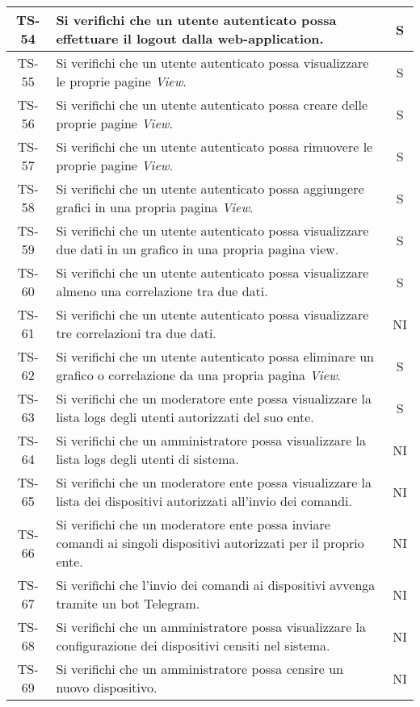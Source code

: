 \begin{center}
\begin{longtable}{|c|p{10cm}|c|}
			 \hline
			 TS-54 & Si verifichi che un utente autenticato possa effettuare il logout dalla web-application. & S \\
			 \hline
			 TS-55 & Si verifichi che un utente autenticato possa visualizzare le proprie pagine \textit{View}. & S \\
			 \hline
			 TS-56 & Si verifichi che un utente autenticato possa creare delle proprie pagine \textit{View}. & S \\
			 \hline
			 TS-57 & Si verifichi che un utente autenticato possa rimuovere le proprie pagine \textit{View}. & S \\
			 \hline
			 TS-58 & Si verifichi che un utente autenticato possa aggiungere grafici in una propria pagina  \textit{View}. & S \\
			 \hline
			 TS-59 & Si verifichi che un utente autenticato possa visualizzare due dati in un grafico in una propria pagina view. & S \\
			 \hline
			 TS-60 & Si verifichi che un utente autenticato possa visualizzare almeno una correlazione tra due dati. & S \\
			 \hline
			 TS-61 & Si verifichi che un utente autenticato possa visualizzare tre correlazioni tra due dati. & NI \\
			 \hline
			 TS-62 & Si verifichi che un utente autenticato possa eliminare un grafico o correlazione da una propria pagina \textit{View}. & S \\
			 \hline
			 TS-63 & Si verifichi che un moderatore ente possa visualizzare la lista logs degli utenti autorizzati del suo ente. & S \\
			 \hline
			 TS-64 & Si verifichi che un amministratore possa visualizzare la lista logs degli utenti di sistema. & NI \\
			 \hline
			 TS-65 & Si verifichi che un moderatore ente possa visualizzare la lista dei dispositivi autorizzati all'invio dei comandi. & NI \\
			 \hline
			 TS-66 & Si verifichi che un moderatore ente possa inviare comandi ai singoli dispositivi autorizzati per il proprio ente. & NI \\
			 \hline
			 TS-67 & Si verifichi che l'invio dei comandi ai dispositivi avvenga tramite un bot Telegram. & NI \\
			 \hline
			 TS-68 & Si verifichi che un amministratore possa visualizzare la configurazione dei dispositivi censiti nel sistema. & NI \\
			 \hline
			 TS-69 & Si verifichi che un amministratore possa censire un nuovo dispositivo. & NI \\

\end{longtable}
\end{center}
